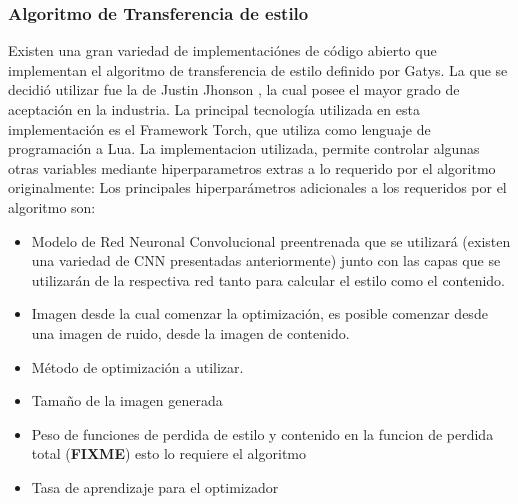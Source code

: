 \documentclass[a4paper,11pt,spanish]{book}
\newcommand*{\FIXME}[1]{{(\textbf{FIXME}) {#1}}}
\begin{document}
      \subsubsection{Algoritmo de Transferencia de estilo}
	Existen una gran variedad de implementaciónes de código abierto que implementan el algoritmo de transferencia de estilo definido por Gatys.
	La que se decidió utilizar fue la de Justin Jhonson \cite{Johnson:Neural_Style}, la cual posee el mayor grado de aceptación en la industria.
	La principal tecnología utilizada en esta implementación es el Framework Torch, que utiliza como lenguaje de programación a Lua.
	La implementacion  utilizada, permite controlar algunas otras variables mediante hiperparametros extras a lo requerido por el algoritmo originalmente:
	Los principales hiperparámetros adicionales a los requeridos por el algoritmo son:
	\begin{itemize}
	  \item Modelo de Red Neuronal Convolucional preentrenada que se utilizará (existen una variedad de CNN presentadas anteriormente) junto con las capas que se utilizarán de la
	  respectiva red tanto para calcular el estilo como el contenido.
	  \item Imagen desde la cual comenzar la optimización, es posible comenzar desde una imagen de ruido, desde la imagen de contenido.
	  \item Método de optimización a utilizar.
	  \item Tamaño de la imagen generada
	  \item Peso de funciones de perdida de estilo y contenido en la funcion de perdida total \FIXME{esto lo requiere el algoritmo}
	  \item Tasa de aprendizaje para el optimizador
	\end{itemize}
\end{document}
